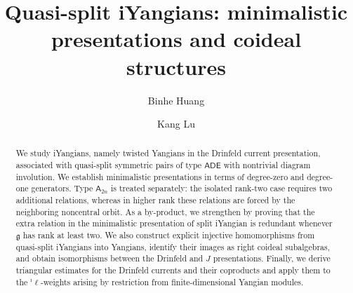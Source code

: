 \documentclass[11pt,reqno]{amsart}
\numberwithin{equation}{section}
\theoremstyle{definition}
\theoremstyle{remark}
\newcommand{\g}{\mathfrak{g}}
\newenvironment{nouppercase}{%
  \let\uppercase\relax%
  \renewcommand{\uppercasenonmath}[1]{}}{}
\begin{document}
\pagestyle{myheadings}
\setcounter{page}{1}

\title[\small Quasi-split iYangians: minimalistic presentations and coideal structures]{\Large Quasi-split iYangians: minimalistic presentations and coideal structures}

\author{Binhe Huang}

\address{
Department of Mathematical Sciences, Indiana University Indianapolis, 402
N. Blackford St., LD 270, Indianapolis, IN 46202, USA
}

\author{Kang Lu}

\address{
Shenzhen International Center for Mathematics and Department of Mathematics, Southern University of Science and Technology, Shenzhen, China
}




\begin{abstract}
We study iYangians, namely twisted Yangians in the Drinfeld current presentation, associated with quasi-split symmetric pairs of type $\mathsf{ADE}$ with nontrivial diagram involution. We establish minimalistic presentations in terms of degree-zero and degree-one generators. Type $\mathsf A_{2n}$ is treated separately: the isolated rank-two case requires two additional relations, whereas in higher rank these relations are forced by the neighboring noncentral orbit. As a by-product, we strengthen \cite[Theorem~3.1]{Lu26min} by proving that the extra relation in the minimalistic presentation of split iYangian is redundant whenever $\g$ has rank at least two. We also construct explicit injective homomorphisms from quasi-split iYangians into Yangians, identify their images as right coideal subalgebras, and obtain isomorphisms between the Drinfeld and $J$ presentations. Finally, we derive triangular estimates for the Drinfeld currents and their coproducts and apply them to the $^\imath\bm\ell$-weights arising by restriction from finite-dimensional Yangian modules.
\end{abstract}
\begin{nouppercase}	
\maketitle
\end{nouppercase}
\setcounter{tocdepth}{1}
\tableofcontents
\end{document}
